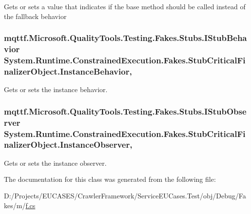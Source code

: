 Gets or sets a value that indicates if the base method should be called instead of the fallback behavior

\hypertarget{class_system_1_1_runtime_1_1_constrained_execution_1_1_fakes_1_1_stub_critical_finalizer_object_a37a4643126d7ff1cf1eb12ee9b5abdf9}{
\subsubsection[{Instance\-Behavior}]{\setlength{\rightskip}{0pt plus 5cm}mqttf.\-Microsoft.\-Quality\-Tools.\-Testing.\-Fakes.\-Stubs.\-I\-Stub\-Behavior System.\-Runtime.\-Constrained\-Execution.\-Fakes.\-Stub\-Critical\-Finalizer\-Object.\-Instance\-Behavior\hspace{0.3cm}{\ttfamily [get]}, {\ttfamily [set]}}}\label{class_system_1_1_runtime_1_1_constrained_execution_1_1_fakes_1_1_stub_critical_finalizer_object_a37a4643126d7ff1cf1eb12ee9b5abdf9}


Gets or sets the instance behavior.

\hypertarget{class_system_1_1_runtime_1_1_constrained_execution_1_1_fakes_1_1_stub_critical_finalizer_object_a9daebf04dc7566840ab6467505dfa5ad}{
\subsubsection[{Instance\-Observer}]{\setlength{\rightskip}{0pt plus 5cm}mqttf.\-Microsoft.\-Quality\-Tools.\-Testing.\-Fakes.\-Stubs.\-I\-Stub\-Observer System.\-Runtime.\-Constrained\-Execution.\-Fakes.\-Stub\-Critical\-Finalizer\-Object.\-Instance\-Observer\hspace{0.3cm}{\ttfamily [get]}, {\ttfamily [set]}}}\label{class_system_1_1_runtime_1_1_constrained_execution_1_1_fakes_1_1_stub_critical_finalizer_object_a9daebf04dc7566840ab6467505dfa5ad}


Gets or sets the instance observer.



The documentation for this class was generated from the following file\-:\begin{DoxyCompactItemize}
\item 
D\-:/\-Projects/\-E\-U\-C\-A\-S\-E\-S/\-Crawler\-Framework/\-Service\-E\-U\-Cases.\-Test/obj/\-Debug/\-Fakes/m/\hyperlink{m_2f_8cs}{f.\-cs}\end{DoxyCompactItemize}
